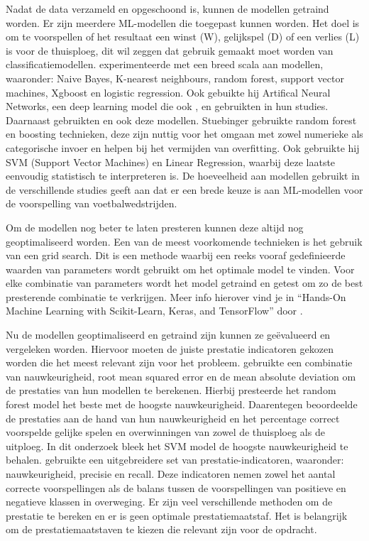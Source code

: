 Nadat de data verzameld en opgeschoond is, kunnen de modellen getraind worden. Er zijn meerdere ML-modellen die toegepast kunnen worden. Het doel is om te voorspellen of het resultaat een winst (W), gelijkspel (D) of een verlies (L) is voor de thuisploeg, dit wil zeggen dat gebruik gemaakt moet worden van classificatiemodellen.
\textcite{Rodrigues2022} experimenteerde met een breed scala aan modellen, waaronder: Naive Bayes, K-nearest neighbours, random forest, support vector machines, Xgboost en logistic regression. Ook gebuikte hij Artifical Neural Networks, een deep learning model die ook \textcite{Bunker2019}, \textcite{Carloni2021} en \textcite{Azeman2022} gebruikten in hun studies. 
Daarnaast gebruikten \textcite{Stuebinger2020} en \textcite{Andrews2021} ook deze modellen. Stuebinger gebruikte random forest en boosting technieken, deze zijn nuttig voor het omgaan met zowel numerieke als categorische invoer en helpen bij het vermijden van overfitting. Ook gebruikte hij SVM (Support Vector Machines) en Linear Regression, waarbij deze laatste eenvoudig statistisch te interpreteren is.
De hoeveelheid aan modellen gebruikt in de verschillende studies geeft aan dat er een brede keuze is aan ML-modellen voor de voorspelling van voetbalwedstrijden.

Om de modellen nog beter te laten presteren kunnen deze altijd nog geoptimaliseerd worden. Een van de meest voorkomende technieken is het gebruik van een grid search. Dit is een methode waarbij een reeks vooraf gedefinieerde waarden van parameters wordt gebruikt om het optimale model te vinden. Voor elke combinatie van parameters wordt het model getraind en getest om zo de best presterende combinatie te verkrijgen. Meer info hierover  vind je in “Hands-On Machine Learning with Scikit-Learn, Keras, and TensorFlow” door \autocite{Geron2019}.

Nu de modellen geoptimaliseerd en getraind zijn kunnen ze geëvalueerd en vergeleken worden. Hiervoor moeten de juiste prestatie indicatoren gekozen worden die het meest relevant zijn voor het probleem.
\textcite{Stuebinger2020} gebruikte een combinatie van nauwkeurigheid, root mean squared error en de mean absolute deviation om de prestaties van hun modellen te berekenen. Hierbij presteerde het random forest model het beste met de hoogste nauwkeurigheid.
Daarentegen beoordeelde \textcite{Rodrigues2022} de prestaties aan de hand van hun nauwkeurigheid en het percentage correct voorspelde gelijke spelen en overwinningen van zowel de thuisploeg als de uitploeg. In dit onderzoek bleek het SVM model de hoogste nauwkeurigheid te behalen.
\textcite{Azeman2022} gebruikte een uitgebreidere set van prestatie-indicatoren, waaronder: nauwkeurigheid, precisie en recall. Deze indicatoren nemen zowel het aantal correcte voorspellingen als de balans tussen de voorspellingen van positieve en negatieve klassen in overweging.
Er zijn veel verschillende methoden om de prestatie te bereken en er is geen optimale prestatiemaatstaf. Het is belangrijk om de prestatiemaatstaven te kiezen die relevant zijn voor de opdracht.

